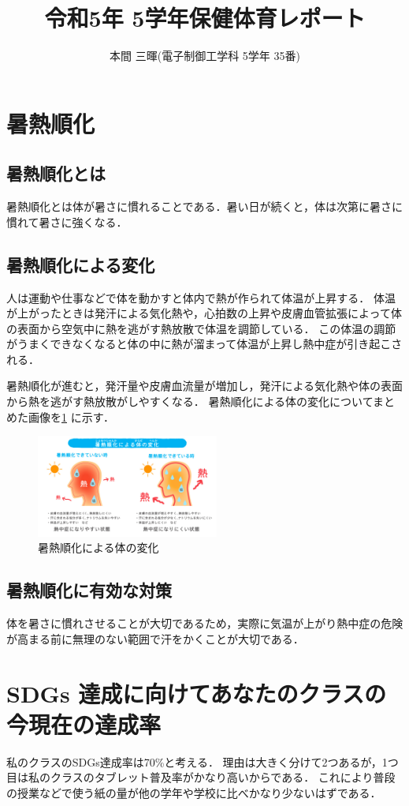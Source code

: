 \documentclass[twocolumn]{jsarticle}
\title{令和5年 5学年保健体育レポート}%
\author{本間 三暉(電子制御工学科 5学年 35番)}%
\date{}
\begin{document}
\twocolumn[%
  \centering
  \maketitle
]

\section{暑熱順化}
\subsection{暑熱順化とは}
暑熱順化とは体が暑さに慣れることである．暑い日が続くと，体は次第に暑さに慣れて暑さに強くなる．


\subsection{暑熱順化による変化}
人は運動や仕事などで体を動かすと体内で熱が作られて体温が上昇する．
体温が上がったときは発汗による気化熱や，心拍数の上昇や皮膚血管拡張によって体の表面から空気中に熱を逃がす熱放散で体温を調節している．
この体温の調節がうまくできなくなると体の中に熱が溜まって体温が上昇し熱中症が引き起こされる．

暑熱順化が進むと，発汗量や皮膚血流量が増加し，発汗による気化熱や体の表面から熱を逃がす熱放散がしやすくなる．
暑熱順化による体の変化についてまとめた画像を\ref{kill1} に示す．

\begin{figure}[H]
  \centering
  \includegraphics[width=6cm]{kill_1.jpg}
  \caption{暑熱順化による体の変化}
  \label{kill1}
\end{figure}

\subsection{暑熱順化に有効な対策}
体を暑さに慣れさせることが大切であるため，実際に気温が上がり熱中症の危険が高まる前に無理のない範囲で汗をかくことが大切である．

\section{SDGs 達成に向けてあなたのクラスの今現在の達成率}
  私のクラスのSDGs達成率は70\%と考える．
  理由は大きく分けて2つあるが，1つ目は私のクラスのタブレット普及率がかなり高いからである．
  これにより普段の授業などで使う紙の量が他の学年や学校に比べかなり少ないはずである．
\end{document}
